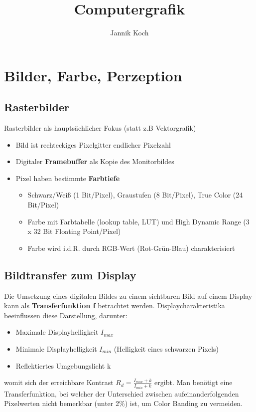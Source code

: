 \documentclass[10pt,a4paper]{article}
\author{Jannik Koch}
\title{Computergrafik}
\begin{document}
	{\let\newpage\relax\maketitle}
	\tableofcontents
	\newpage
	\setcounter{page}{1}

	\section{Bilder, Farbe, Perzeption}
	\label{bfp:sec:bilder_farbe_perzeption}
	
	\subsection{Rasterbilder}
	\label{bfp:sub:rasterbilder}

	Rasterbilder als hauptsächlicher Fokus (statt z.B Vektorgrafik)
	\begin{itemize}
		\item Bild ist rechteckiges Pixelgitter endlicher Pixelzahl
		\item Digitaler \textbf{Framebuffer} als Kopie des Monitorbildes
		\item Pixel haben bestimmte \textbf{Farbtiefe}
		\begin{itemize}
			\item Schwarz/Weiß (1 Bit/Pixel), Graustufen (8 Bit/Pixel), True Color (24 Bit/Pixel)
			\item Farbe mit Farbtabelle (lookup table, \glqq LUT\grqq) und High Dynamic Range (3 x 32 Bit Floating Point/Pixel)
			\item Farbe wird i.d.R. durch RGB-Wert (Rot-Grün-Blau) charakterisiert
		\end{itemize}
	\end{itemize}

	\subsection{Bildtransfer zum Display}
	\label{bfp:sub:bildtransfer_zum_display}

	Die Umsetzung eines digitalen Bildes zu einem sichtbaren Bild auf einem Display kann als \textbf{Transferfunktion f} betrachtet werden. Displaycharakteristika beeinflussen diese Darstellung, darunter:
	\begin{itemize}
		\item Maximale Displayhelligkeit $I_{max}$
		\item Minimale Displayhelligkeit $I_{min}$ (Helligkeit eines schwarzen Pixels)
		\item Reflektiertes Umgebungslicht k
	\end{itemize}
	womit sich der erreichbare Kontrast $R_d = \frac{I_{max} + k}{I_{min} + k}$ ergibt. Man benötigt eine Transferfunktion, bei welcher der Unterschied zwischen aufeinanderfolgenden Pixelwerten nicht bemerkbar (unter 2\%) ist, um Color Banding zu vermeiden.
\end{document}

